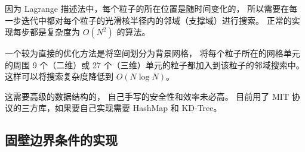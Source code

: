 \begin{frame}
    \frametitle{\subsecname}
    因为 Lagrange 描述法中，每个粒子的所在位置是随时间变化的，
    所以需要在每一步迭代中都对每个粒子的光滑核半径内的邻域（支撑域）进行搜索。
    正常的实现每步都是复杂度为 $O(N^2)$ 的算法。

    一个较为直接的优化方法是将空间划分为背景网格，
    将每个粒子所在的网格单元的周围 9 个（二维）或 27 个（三维）单元的粒子都加入到该粒子的邻域搜索中。
    这样可以将搜索复杂度降低到 $O(N\log N)$。

    \begin{figure}[H]
        \centering
    \end{figure}
    这需要高级的数据结构的，
    自己手写的安全性和效率未必高。
    目前用了 MIT 协议的三方库，如果要自己实现需要 HashMap 和 KD-Tree。
\end{frame}

\subsection{固壁边界条件的实现}

